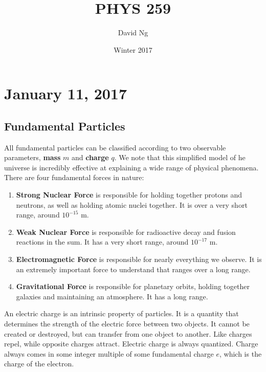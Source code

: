 \documentclass[11pt]{article}
\theoremstyle{plain} %
\theoremstyle{definition}
\theoremstyle{example}
\theoremstyle{remark}
\begin{document}
\title{PHYS 259}
\author{David Ng}
\date{Winter 2017}
\maketitle

\tableofcontents

\eject


\section{January 11, 2017}
\subsection{Fundamental Particles}

All fundamental particles can be classified according to two observable parameters, \textbf{mass} $m$ and \textbf{charge} $q$. We note that this simplified model of he universe is incredibly effective at explaining a wide range of physical phenomena. There are four fundamental forces in nature:

\begin{enumerate}
\item \textbf{Strong Nuclear Force} is responsible for holding together protons and neutrons, as well as holding atomic nuclei together. It is over a very short range, around $10^{-15}$ m.
	\item \textbf{Weak Nuclear Force} is responsible for radioactive decay and fusion reactions in the sum. It has a very short range, around $10^{-17}$ m. 
	\item \textbf{Electromagnetic Force} is responsible for nearly everything we observe. It is an extremely important force to understand that ranges over a long range. 
	\item \textbf{Gravitational Force} is responsible for planetary orbits, holding together galaxies and maintaining an atmosphere. It has a long range. 
\end{enumerate}

An electric charge is an intrinsic property of particles. It is a quantity that determines the strength of the electric force between two objects. It cannot be created or destroyed, but can transfer from one object to another. Like charges repel, while opposite charges attract. Electric charge is always quantized. Charge always comes in some integer multiple of some fundamental charge $e$, which is the charge of the electron. 
\end{document}
